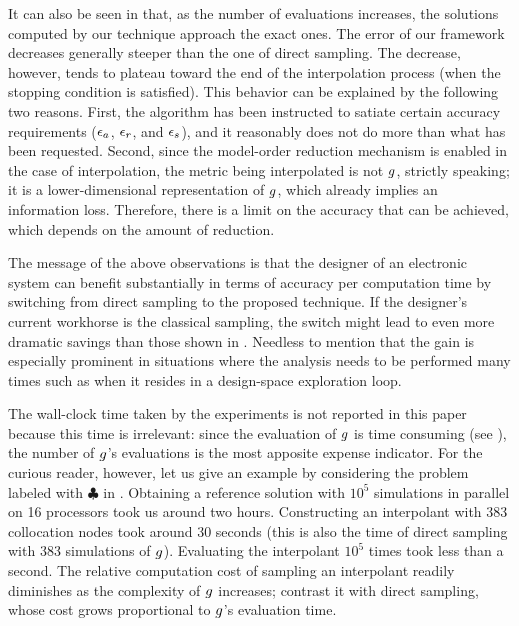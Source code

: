 It can also be seen in  that, as the number of evaluations
increases, the solutions computed by our technique approach the exact ones. The
error of our framework decreases generally steeper than the one of direct
sampling. The decrease, however, tends to plateau toward the end of the
interpolation process (when the stopping condition is satisfied). This behavior
can be explained by the following two reasons. First, the algorithm has been
instructed to satiate certain accuracy requirements ($\epsilon_a$, $\epsilon_r$, and
$\epsilon_s$), and it reasonably does not do more than what has been requested.
Second, since the model-order reduction mechanism is enabled in the case of
interpolation, the metric being interpolated is not $g$, strictly speaking; it
is a lower-dimensional representation of $g$, which already implies an
information loss. Therefore, there is a limit on the accuracy that can be
achieved, which depends on the amount of reduction.

The message of the above observations is that the designer of an electronic
system can benefit substantially in terms of accuracy per computation time by
switching from direct sampling to the proposed technique. If the designer's
current workhorse is the classical  sampling, the switch might lead to
even more dramatic savings than those shown in . Needless to
mention that the gain is especially prominent in situations where the analysis
needs to be performed many times such as when it resides in a design-space
exploration loop.

\begin{remark}
The wall-clock time taken by the experiments is not reported in this paper
because this time is irrelevant: since the evaluation of $g$ is time consuming
(see ), the number of $g$'s evaluations is the most apposite
expense indicator. For the curious reader, however, let us give an example by
considering the problem labeled with $\clubsuit$ in . Obtaining a
reference solution with $10^5$ simulations in parallel on 16 processors took us
around two hours. Constructing an interpolant with 383 collocation nodes took
around 30 seconds (this is also the time of direct sampling with 383 simulations
of $g$). Evaluating the interpolant $10^5$ times took less than a second. The
relative computation cost of sampling an interpolant readily diminishes as the
complexity of $g$ increases; contrast it with direct sampling, whose cost grows
proportional to $g$'s evaluation time.
\end{remark}
